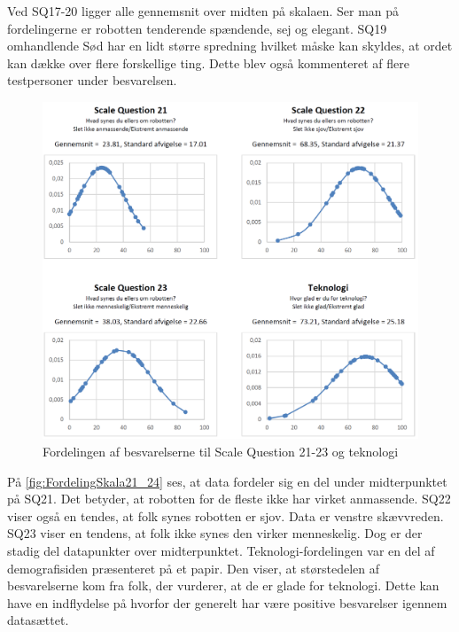 Ved SQ17-20 ligger alle gennemsnit over midten på skalaen. Ser man på fordelingerne er robotten tenderende spændende, sej og elegant. SQ19 omhandlende Sød har en lidt større spredning hvilket måske kan skyldes, at ordet kan dække over flere forskellige ting. Dette blev også kommenteret af flere testpersoner under besvarelsen. 

\begin{figure}[H]
\centering
\includegraphics[width =\textwidth]{Figure/DatabehandlingSkalaer/FordelingSkala21_24} 
\caption{Fordelingen af besvarelserne til Scale Question 21-23 og teknologi}
\label{fig:FordelingSkala21_24}
\end{figure}
\noindent

På \autoref{fig:FordelingSkala21_24} ses, at data fordeler sig en del under midterpunktet på SQ21. Det betyder, at robotten for de fleste ikke har virket anmassende. SQ22 viser også en tendes, at folk synes robotten er sjov. Data er venstre skævvreden.  SQ23 viser en tendens, at folk ikke synes den virker menneskelig. Dog er der stadig del datapunkter over midterpunktet. Teknologi-fordelingen var en del af demografisiden præsenteret på et papir. Den viser, at størstedelen af besvarelserne kom fra folk, der vurderer, at de er glade for teknologi. Dette kan have en indflydelse på hvorfor der generelt har være positive besvarelser igennem datasættet. 

